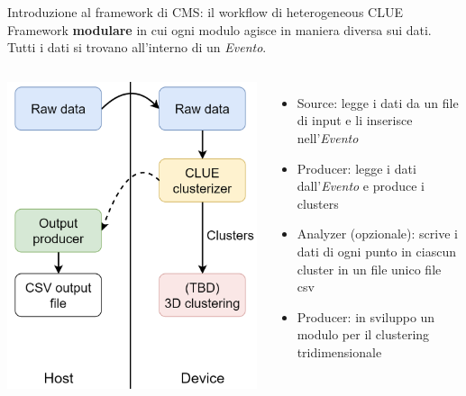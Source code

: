 \documentclass{beamer}
\begin{document}
\begin{frame}{Introduzione al framework di CMS: il workflow di heterogeneous CLUE}
Framework \textbf{modulare} in cui ogni modulo agisce in maniera diversa sui dati. Tutti i dati si trovano all'interno di un \emph{Evento}.
\vspace{3mm}
\begin{columns}
\includegraphics[width=\textwidth]{media/hclue_workflow.png}
\begin{itemize}
    \item \textcolor{hclue_blue}{Source}: legge i dati da un file di input e li inserisce nell'\emph{Evento}
    \item \textcolor{hclue_yellow}{Producer}: legge i dati dall'\emph{Evento} e produce i clusters
    \item \textcolor{hclue_green}{Analyzer (opzionale)}: scrive i dati di ogni punto in ciascun cluster in un file unico file csv
    \item \textcolor{hclue_red}{Producer}: in sviluppo un modulo per il clustering tridimensionale
\end{itemize}
\end{columns}
\end{frame}
\end{document}
